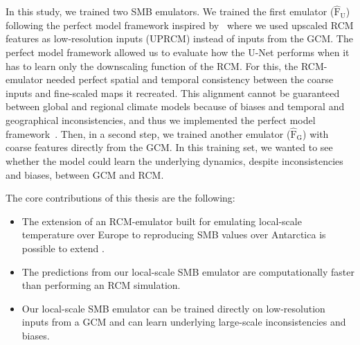 \documentclass[a4paper,11pt,oneside]{report}
\begin{document}
In this study, we trained two SMB emulators. We trained the first emulator ($\operatorname{\mathrm{\hat{F}_U}}$) following the perfect model framework inspired by~\cite{Doury} where we used upscaled RCM features as low-resolution inputs (UPRCM) instead of inputs from the GCM. The perfect model framework allowed us to evaluate how the U-Net performs when it has to learn only the downscaling function of the RCM. For this, the RCM-emulator needed perfect spatial and temporal consistency between the coarse inputs and fine-scaled maps it recreated. This alignment cannot be guaranteed between global and regional climate models because of biases and temporal and geographical inconsistencies, and thus we implemented the perfect model framework~\cite{Doury, Sanchez2009, Sanchez2018}. Then, in a second step, we trained another emulator ($\operatorname{\mathrm{\hat{F}_G}}$) with coarse features directly from the GCM. In this training set, we wanted to see whether the model could learn the underlying dynamics, despite inconsistencies and biases, between GCM and RCM. 
    
    

    

The core contributions of this thesis are the following: 
    \begin{itemize}
        \item The extension of an RCM-emulator built for emulating local-scale temperature over Europe to reproducing SMB values over Antarctica is possible to extend .
        \item The predictions from our local-scale SMB emulator are computationally faster than performing an RCM simulation. 
        \item Our local-scale SMB emulator can be trained directly on low-resolution inputs from a GCM and can learn underlying large-scale inconsistencies and biases.
        \end{itemize}
\end{document}
